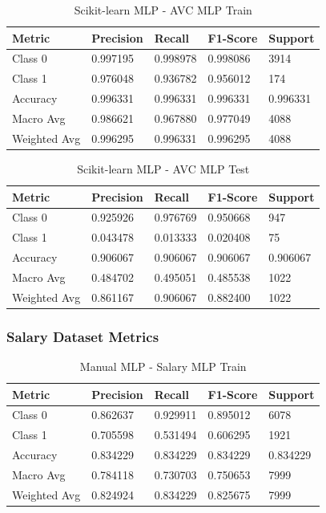 \documentclass[a4paper,12pt]{article}
\begin{document}
\begin{table}[h!]
    \centering
    \caption{Scikit-learn MLP - AVC MLP Train}
    \begin{tabularx}{\textwidth}{|l|X|X|X|X|}
    \hline
    \textbf{Metric} & \textbf{Precision} & \textbf{Recall} & \textbf{F1-Score} & \textbf{Support} \\
    \hline
    Class 0 & 0.997195 & 0.998978 & 0.998086 & 3914 \\
    Class 1 & 0.976048 & 0.936782 & 0.956012 & 174 \\
    Accuracy & 0.996331 & 0.996331 & 0.996331 & 0.996331 \\
    Macro Avg & 0.986621 & 0.967880 & 0.977049 & 4088 \\
    Weighted Avg & 0.996295 & 0.996331 & 0.996295 & 4088 \\
    \hline
    \end{tabularx}
\end{table}

\begin{table}[h!]
    \centering
    \caption{Scikit-learn MLP - AVC MLP Test}
    \begin{tabularx}{\textwidth}{|l|X|X|X|X|}
    \hline
    \textbf{Metric} & \textbf{Precision} & \textbf{Recall} & \textbf{F1-Score} & \textbf{Support} \\
    \hline
    Class 0 & 0.925926 & 0.976769 & 0.950668 & 947 \\
    Class 1 & 0.043478 & 0.013333 & 0.020408 & 75 \\
    Accuracy & 0.906067 & 0.906067 & 0.906067 & 0.906067 \\
    Macro Avg & 0.484702 & 0.495051 & 0.485538 & 1022 \\
    Weighted Avg & 0.861167 & 0.906067 & 0.882400 & 1022 \\
    \hline
    \end{tabularx}
\end{table}

\newpage
\subsubsection{Salary Dataset Metrics}

\begin{table}[h!]
    \centering
    \caption{Manual MLP - Salary MLP Train}
    \begin{tabularx}{\textwidth}{|l|X|X|X|X|}
    \hline
    \textbf{Metric} & \textbf{Precision} & \textbf{Recall} & \textbf{F1-Score} & \textbf{Support} \\
    \hline
    Class 0 & 0.862637 & 0.929911 & 0.895012 & 6078 \\
    Class 1 & 0.705598 & 0.531494 & 0.606295 & 1921 \\
    Accuracy & 0.834229 & 0.834229 & 0.834229 & 0.834229 \\
    Macro Avg & 0.784118 & 0.730703 & 0.750653 & 7999 \\
    Weighted Avg & 0.824924 & 0.834229 & 0.825675 & 7999 \\
    \hline
    \end{tabularx}
\end{table}
\end{document}
